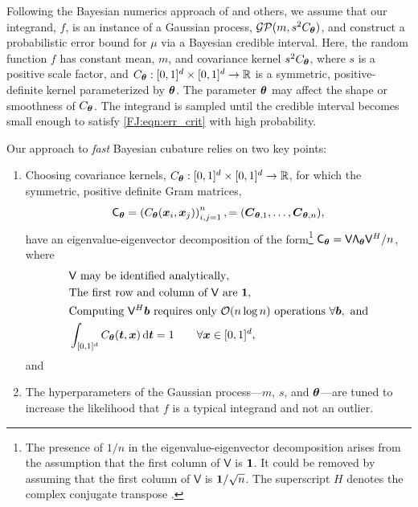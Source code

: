 \documentclass[graybox,footinfo]{svmult}
\begin{document}
Following the Bayesian numerics approach of \cite{BriEtal18a, Dia88a, OHa91a, RasGha03a} and others, we assume that our integrand, $f$, is an instance of a Gaussian process, $\mathcal{GP}(m,s^2 C_{\boldsymbol{\theta}})$, and construct a probabilistic error bound for $\mu$ via a Bayesian credible interval. 
Here, the random function $f$ has constant mean, $m$, and covariance kernel $s^2C_{\boldsymbol{\theta}}$, where $s$ is a positive scale factor, and $C_{\boldsymbol{\theta}}: [0,1]^d \times [0,1]^d \to \mathbb{R} $ is a symmetric, positive-definite kernel parameterized by ${\boldsymbol{\theta}}$.   The parameter ${\boldsymbol{\theta}}$ may affect the shape or smoothness of $C_{\boldsymbol{\theta}}$.  
The integrand is sampled until the credible interval becomes small enough to satisfy \eqref{FJ:eqn:err_crit} with high probability.  

Our approach to \emph{fast} Bayesian cubature \cite{RatHic19a} relies on two key points:
\begin{enumerate}
\renewcommand{\labelenumi}{\roman{enumi})}
    \item Choosing covariance kernels, $C_{\boldsymbol{\theta}}:[0,1]^d \times [0,1]^d \to {\mathbb{R}}$, for which the symmetric, positive definite Gram matrices, 
    \begin{equation} \label{FJ:eq:Gram}
        \mathsf{C}_\bstheta = \left(  C_\bstheta(\bsx_i,\bsx_j)  \right)_{i,j=1}^n, = (\bsC_{\bstheta,1}, \ldots, \bsC_{\bstheta,n}),
    \end{equation}
    have an eigenvalue-eigenvector decomposition of the form\footnote{The presence of $1/n$ in the eigenvalue-eigenvector decomposition arises from the assumption that the first column of $\mathsf{V}$ is ${\boldsymbol{1}}$.  It could be removed by assuming that the first column of $\mathsf{V}$ is ${\boldsymbol{1}}/\sqrt{n}$.  The superscript $H$ denotes the complex conjugate transpose \cite{Ber09a}.} $\mathsf{C}_{\boldsymbol{\theta}} = \mathsf{V} \mathsf{\Lambda}_{\boldsymbol{\theta}} \mathsf{V}^H/n$, where
    \begin{subequations} \label{FJ:eq:fastcompAssump}
	\begin{align}
	\label{FJ:eq:fastcompAssumpA}
	& \mathsf{V} \text{ may be identified analytically}, \\
	\label{FJ:eq:fastcompAssumpB}
	&\text{The first row and column of $\mathsf{V}$ are } \bsone, \\
	\label{FJ:eq:fastcompAssumpC}
	& \text{Computing $\mathsf{V}^H \bsb$ requires only $\calO(n \log n)$ operations } \forall \bsb, \text{ and} \\
	\label{FJ:addAssump}
    & \int_{[0,1]^d} C_\bstheta(\bst,\bsx) \, \D \bst = 1 \qquad \forall \bsx \in [0,1]^d,
	\end{align}
\end{subequations}
and
\item The hyperparameters of the Gaussian process---$m$, $s$, and ${\boldsymbol{\theta}}$---are tuned to increase the likelihood that $f$ is a typical integrand and not an outlier.
\end{enumerate}
\end{document}
